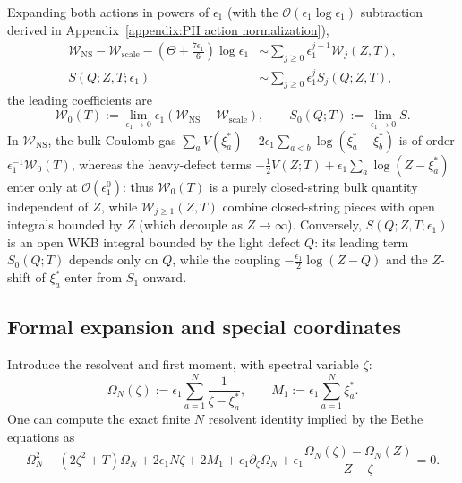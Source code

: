 \documentclass[a4paper,11pt]{article}
\numberwithin{equation}{section}
\begin{document}
Expanding both actions in powers of $\epsilon_{1}$ (with the
$\mathcal{O}(\epsilon_{1}\log\epsilon_{1})$ subtraction derived in
Appendix~\ref{appendix:PII action normalization}),
\begin{equation}
	\label{equation:PII chapter7 action expansion convention}
	\begin{aligned}
		\mathcal{W}_{\mathrm{NS}}-\mathcal{W}_{\mathrm{scale}}
		-\left(\Theta+\frac{7\epsilon_{1}}{6}\right)\log{\epsilon_{1}}
		&\sim\sum_{j\geq0}\epsilon_{1}^{j-1}\mathcal{W}_{j}(Z,T),\\
		S(Q;Z,T;\epsilon_{1})&\sim\sum_{j\geq0}\epsilon_{1}^{j}S_{j}(Q;Z,T),
	\end{aligned}
\end{equation}
the leading coefficients are
\begin{equation}
	\label{equation:PII chapter7 leading action}
	\mathcal{W}_{0}(T)
	:=\lim_{\epsilon_{1}\to0}\epsilon_{1}
	\left(\mathcal{W}_{\mathrm{NS}}-\mathcal{W}_{\mathrm{scale}}\right),
	\qquad S_{0}(Q;T):=\lim_{\epsilon_{1}\to0}S.
\end{equation}
In $\mathcal{W}_{\mathrm{NS}}$, the bulk Coulomb gas
$\sum_{a}V(\xi_{a}^{*})-2\epsilon_{1}\sum_{a<b}\log{(\xi_{a}^{*}-\xi_{b}^{*})}$
is of order $\epsilon_{1}^{-1}\mathcal{W}_{0}(T)$, whereas the
heavy-defect terms $-\frac{1}{2}V(Z;T)+\epsilon_{1}\sum_{a}\log{(Z-\xi_{a}^{*})}$
enter only at $\mathcal{O}(\epsilon_{1}^{0})$: thus $\mathcal{W}_{0}(T)$ is
a purely closed-string bulk quantity independent of $Z$, while
$\mathcal{W}_{j\geq1}(Z,T)$ combine closed-string pieces with open
integrals bounded by $Z$ (which decouple as $Z\to\infty$).  Conversely,
$S(Q;Z,T;\epsilon_{1})$ is an open WKB integral bounded by the light
defect $Q$: its leading term $S_{0}(Q;T)$ depends only on $Q$, while
the coupling $-\frac{\epsilon_{1}}{2}\log{(Z-Q)}$ and the $Z$-shift of
$\xi_{a}^{*}$ enter from $S_{1}$ onward.

\subsection{Formal expansion and special coordinates}
\label{subsection:PII planar SW proof}

Introduce the resolvent and first moment, with spectral variable
$\zeta$:
\begin{equation}
	\label{equation:PII chapter7 finite resolvent}
	\Omega_{N}(\zeta):=\epsilon_{1}\sum_{a=1}^{N}
	\frac{1}{\zeta-\xi_{a}^{*}},\qquad
	M_{1}:=\epsilon_{1}\sum_{a=1}^{N}\xi_{a}^{*}.
\end{equation}
One can compute the exact finite $N$ resolvent identity implied by the Bethe equations as 
\begin{equation}
\label{eq:exactresolventBethe}
\Omega_N^2 - (2\zeta^2+T) \Omega_N + 2\epsilon_1N\zeta + 2M_1 + \epsilon_1\partial_\zeta \Omega_N 
+ \epsilon_1 \frac{\Omega_N(\zeta) - \Omega_N(Z)}{Z-\zeta} = 0.
\end{equation}
\end{document}
